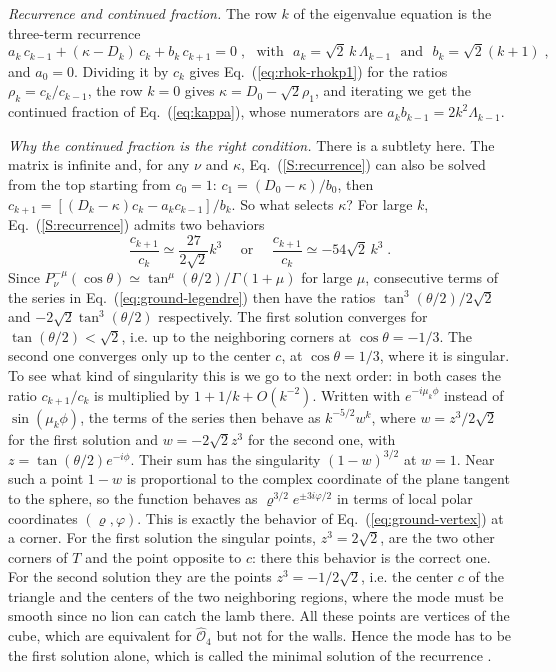 \emph{Recurrence and continued fraction.} The row $k$ of the eigenvalue equation is the three-term recurrence
\begin{equation} \label{S:recurrence}
    a_k \, c_{k-1} + (\kappa - D_k) \, c_k + b_k \, c_{k+1} = 0 \;, \mbox{~~with~~} a_k = \sqrt{2} \, k \, \Lambda_{k-1} \mbox{~~and~~} b_k = \sqrt{2} (k + 1) \;,
\end{equation}
and $a_0 = 0$. Dividing it by $c_k$ gives Eq.~(\ref{eq:rhok-rhokp1}) for the ratios $\rho_k = c_k/c_{k-1}$, the row $k = 0$ gives $\kappa = D_0 - \sqrt{2} \rho_1$, and iterating we get the continued fraction of Eq.~(\ref{eq:kappa}), whose numerators are $a_k b_{k-1} = 2 k^2 \Lambda_{k-1}$.

\emph{Why the continued fraction is the right condition.} There is a subtlety here. The matrix is infinite and, for any $\nu$ and $\kappa$, Eq.~(\ref{S:recurrence}) can also be solved from the top starting from $c_0 = 1$: $c_1 = (D_0 - \kappa)/b_0$, then $c_{k+1} = [(D_k - \kappa) c_k - a_k c_{k-1}]/b_k$. So what selects $\kappa$? For large $k$, Eq.~(\ref{S:recurrence}) admits two behaviors
\begin{equation} \label{S:two-behaviors}
    \frac{c_{k+1}}{c_k} \simeq \frac{27}{2 \sqrt{2}} k^3 \mbox{~~~~or~~~~} \frac{c_{k+1}}{c_k} \simeq - 54 \sqrt{2} \, k^3 \;.
\end{equation}
Since $P_\nu^{-\mu}(\cos \theta) \simeq \tan^{\mu}(\theta/2)/\Gamma(1 + \mu)$ for large $\mu$, consecutive terms of the series in Eq.~(\ref{eq:ground-legendre}) then have the ratios $\tan^3(\theta/2)/2\sqrt{2}$ and $-2 \sqrt{2} \tan^3(\theta/2)$ respectively. The first solution converges for $\tan(\theta/2) < \sqrt{2}$, i.e. up to the neighboring corners at $\cos \theta = -1/3$. The second one converges only up to the center $c$, at $\cos \theta = 1/3$, where it is singular. To see what kind of singularity this is we go to the next order: in both cases the ratio $c_{k+1}/c_k$ is multiplied by $1 + 1/k + O(k^{-2})$. Written with $e^{-i \mu_k \phi}$ instead of $\sin (\mu_k \phi)$, the terms of the series then behave as $k^{-5/2} w^k$, where $w = z^3/2\sqrt{2}$ for the first solution and $w = - 2 \sqrt{2} z^3$ for the second one, with $z = \tan(\theta/2) e^{-i \phi}$. Their sum has the singularity $(1 - w)^{3/2}$ at $w = 1$. Near such a point $1 - w$ is proportional to the complex coordinate of the plane tangent to the sphere, so the function behaves as $\varrho^{3/2} e^{\pm 3 i \varphi/2}$ in terms of local polar coordinates $(\varrho, \varphi)$. This is exactly the behavior of Eq.~(\ref{eq:ground-vertex}) at a corner. For the first solution the singular points, $z^3 = 2 \sqrt{2}$, are the two other corners of $T$ and the point opposite to $c$: there this behavior is the correct one. For the second solution they are the points $z^3 = -1/2\sqrt{2}$, i.e. the center $c$ of the triangle and the centers of the two neighboring regions, where the mode must be smooth since no lion can catch the lamb there. All these points are vertices of the cube, which are equivalent for $\hat{\mathcal{O}}_4$ but not for the walls. Hence the mode has to be the first solution alone, which is called the minimal solution of the recurrence \cite{Gautschi67}.

